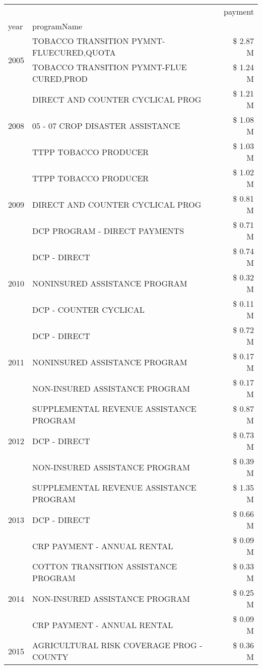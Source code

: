 \begin{tabular}{llr}
\toprule
 &  & payment \\
year & programName &  \\
\midrule
\multirow[t]{2}{*}{2005} & TOBACCO TRANSITION PYMNT-FLUECURED,QUOTA & \$ 2.87 M \\
 & TOBACCO TRANSITION PYMNT-FLUE CURED,PROD & \$ 1.24 M \\
\cline{1-3}
\multirow[t]{3}{*}{2008} & DIRECT AND COUNTER CYCLICAL PROG & \$ 1.21 M \\
 & 05 - 07 CROP DISASTER ASSISTANCE & \$ 1.08 M \\
 & TTPP TOBACCO PRODUCER & \$ 1.03 M \\
\cline{1-3}
\multirow[t]{3}{*}{2009} & TTPP TOBACCO PRODUCER & \$ 1.02 M \\
 & DIRECT AND COUNTER CYCLICAL PROG & \$ 0.81 M \\
 & DCP PROGRAM - DIRECT PAYMENTS & \$ 0.71 M \\
\cline{1-3}
\multirow[t]{3}{*}{2010} & DCP - DIRECT & \$ 0.74 M \\
 & NONINSURED ASSISTANCE PROGRAM & \$ 0.32 M \\
 & DCP - COUNTER CYCLICAL & \$ 0.11 M \\
\cline{1-3}
\multirow[t]{3}{*}{2011} & DCP - DIRECT & \$ 0.72 M \\
 & NONINSURED ASSISTANCE PROGRAM & \$ 0.17 M \\
 & NON-INSURED ASSISTANCE PROGRAM & \$ 0.17 M \\
\cline{1-3}
\multirow[t]{3}{*}{2012} & SUPPLEMENTAL REVENUE ASSISTANCE PROGRAM & \$ 0.87 M \\
 & DCP - DIRECT & \$ 0.73 M \\
 & NON-INSURED ASSISTANCE PROGRAM & \$ 0.39 M \\
\cline{1-3}
\multirow[t]{3}{*}{2013} & SUPPLEMENTAL REVENUE ASSISTANCE PROGRAM & \$ 1.35 M \\
 & DCP - DIRECT & \$ 0.66 M \\
 & CRP PAYMENT - ANNUAL RENTAL & \$ 0.09 M \\
\cline{1-3}
\multirow[t]{3}{*}{2014} & COTTON TRANSITION ASSISTANCE PROGRAM & \$ 0.33 M \\
 & NON-INSURED ASSISTANCE PROGRAM & \$ 0.25 M \\
 & CRP PAYMENT - ANNUAL RENTAL & \$ 0.09 M \\
\cline{1-3}
\multirow[t]{3}{*}{2015} & AGRICULTURAL RISK COVERAGE PROG - COUNTY & \$ 0.36 M \\

\end{tabular}
